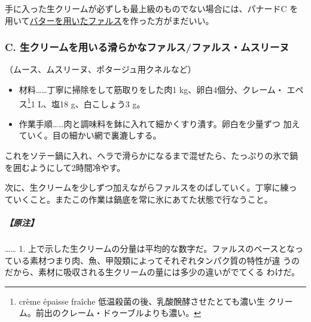 \begin{recette}
手に入った生クリームが必ずしも最上級のものでない場合には、パナードC を
用いて\protect\hyperlink{farce-a}{バターを用いたファルス}を作った方がまだいい。

\hypertarget{farce-c}{%
\subsubsection{C.
生クリームを用いる滑らかなファルス/ファルス・ムスリーヌ}\label{farce-c}}



（ムース、ムスリーヌ、ポタージュ用クネルなど）

\begin{itemize}
\item
  材料\ldots{}\ldots{}丁寧に掃除をして筋取りをした肉1
  kg、卵白4個分、クレーム・ エペス\footnote{crème épaisse fraîche
    低温殺菌の後、乳酸醗酵させたとても濃い生
    クリーム。前出のクレーム・ドゥーブルよりも濃い。}1\undemi{} L、塩18
  g、白こしょう3 g。
\item
  作業手順\ldots{}\ldots{}肉と調味料を鉢に入れて細かくすり潰す。卵白を少量ずつ
  加えていく。目の細かい網で裏漉しする。
\end{itemize}

これをソテー鍋に入れ、ヘラで滑らかになるまで混ぜたら、たっぷりの氷で鍋
を囲むようにして2時間冷やす。

次に、生クリームを少しずつ加えながらファルスをのばしていく。丁寧に練っ
ていくこと。またこの作業は鍋底を常に氷にあてた状態で行なうこと。

\hypertarget{nota-farce-c}{%
\subparagraph{【原注】}\label{nota-farce-c}}

\ldots{}\ldots{} 1.
上で示した生クリームの分量は平均的な数字だ。ファルスのベースとなっ
ている素材つまり肉、魚、甲殻類によってそれぞれタンパク質の特性が違
うのだから、素材に吸収される生クリームの量には多少の違いがでてくる
わけだ。


\end{recette}
